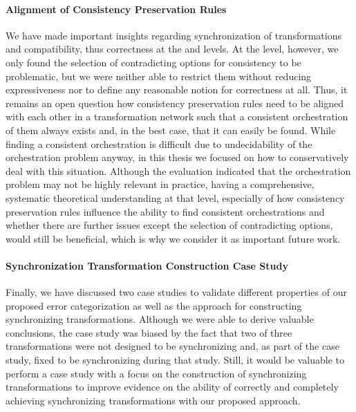\paragraph{Alignment of Consistency Preservation Rules}
We have made important insights regarding synchronization of transformations and compatibility, thus correctness at the \leveltransformation and \levelnetworkrelation levels.
At the \levelnetworkrule level, however, we only found the selection of contradicting options for consistency to be problematic, but we were neither able to restrict them without reducing expressiveness nor to define any reasonable notion for correctness at all.
Thus, it remains an open question how consistency preservation rules need to be aligned with each other in a transformation network such that a consistent orchestration of them always exists and, in the best case, that it can easily be found.
While finding a consistent orchestration is difficult due to undecidability of the orchestration problem anyway, in this thesis we focused on how to conservatively deal with this situation.
Although the evaluation indicated that the orchestration problem may not be highly relevant in practice, having a comprehensive, systematic theoretical understanding at that level, especially of how consistency preservation rules influence the ability to find consistent orchestrations and whether there are further issues except the selection of contradicting options, would still be beneficial, which is why we consider it as important future work.

\paragraph{Synchronization Transformation Construction Case Study}
Finally,  we have discussed two case studies to validate different properties of our proposed error categorization as well as the approach for constructing synchronizing transformations.
Although we were able to derive valuable conclusions, the case study was biased by the fact that two of three transformations were not designed to be synchronizing and, as part of the case study, fixed to be synchronizing during that study.
Still, it would be valuable to perform a case study with a focus on the construction of synchronizing transformations to improve evidence on the ability of correctly and completely achieving synchronizing transformations with our proposed approach.

